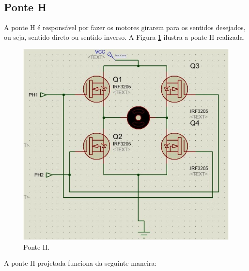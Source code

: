 \subsection{Ponte H}

A ponte H é responsável por fazer os motores girarem para os sentidos desejados, ou seja, sentido direto ou sentido inverso.
A Figura \ref{fig:ponte} ilustra a ponte H realizada.

\begin{figure}[h!]
  \centering
    \includegraphics[scale=0.5]{figuras/Ponte_H.jpg}
  \caption{Ponte H.}
    \label{fig:ponte}
\end{figure}

A ponte H projetada funciona da seguinte maneira: 

